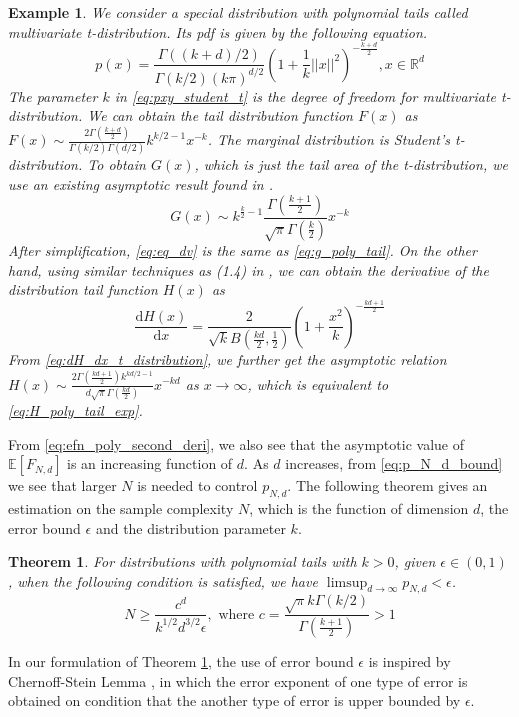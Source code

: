 \documentclass[conference,a4paper]{IEEEtran}
\def\E{\mathbb{E}}
\def\dd{\mathrm{d}}
\newtheorem{theorem}{Theorem}
\newtheorem{example}{Example}
\begin{document}
\begin{example}
     We consider a special distribution with polynomial tails called multivariate t-distribution.
     Its pdf is given by the following equation.
     \begin{equation}\label{eq:pxy_student_t}
          p(x) = \frac{\Gamma((k+d)/2)}{\Gamma(k/2)(k\pi)^{d/2}}
          \left(1+\frac{1}{k}||x||^2
          \right)^{-\frac{k+d}{2}}, x \in \mathbb{R}^d
      \end{equation}
      The parameter $k$ in \eqref{eq:pxy_student_t} is the degree of freedom for multivariate t-distribution.
      We can obtain the tail distribution function
      $F(x)$ as $F(x) \sim \frac{2\Gamma(\frac{k+d}{2})}{\Gamma(k/2)\Gamma(d/2)} k^{k/2-1} x^{-k}$.
      The marginal distribution is Student's t-distribution. To obtain $G(x)$, which is just the tail area
of the t-distribution, we use an existing asymptotic result found in \cite{andrew1976}.
\begin{equation} \label{eq:eq_dv}
    G(x) \sim k^{\frac{k}{2}-1} \frac{\Gamma \left(\frac{k+1}{2} \right)}
    {\sqrt{\pi} \Gamma\left(\frac{k}{2}\right)}x^{-k}
\end{equation}
After simplification, \eqref{eq:eq_dv} is the same as \eqref{eq:g_poly_tail}.
On the other hand, using similar techniques as (1.4) in \cite{raynaud1970enveloppe},
we can obtain the derivative of the distribution tail function $H(x)$ as
\begin{equation}\label{eq:dH_dx_t_distribution}
     \frac{\dd H(x)}{\dd x} =  \frac{2}{\sqrt{k} B(\frac{kd}{2},\frac{1}{2})} \left(1 + \frac{x^2}{k} \right)^{-\frac{kd+1}{2}} 
\end{equation}
From \eqref{eq:dH_dx_t_distribution}, we further get the asymptotic relation $H(x) \sim \frac{2 \Gamma(\frac{kd+1}{2}) k^{kd/2-1}}{d\sqrt{\pi} \Gamma(\frac{kd}{2})}
x^{-kd}$ as $x\to \infty$, which is equivalent to \eqref{eq:H_poly_tail_exp}.

\end{example}
From \eqref{eq:efn_poly_second_deri}, we also see that
the asymptotic value of $\E[F_{N,d}]$ is an increasing function of $d$.
As $d$ increases, from \eqref{eq:p_N_d_bound} we see that larger $N$ is needed to control $p_{N,d}$.
The following theorem gives an estimation on the sample complexity $N$,
which is the function of dimension $d$, the error bound $\epsilon$ and the distribution parameter $k$.
\begin{theorem}\label{thm:poly_tail_sample_complexity}
  For distributions with polynomial tails with $k>0$, given $\epsilon \in (0,1)$,
  when the following condition is satisfied,
  we have $\limsup_{d\to\infty} p_{N,d} < \epsilon$.
\begin{equation}\label{eq:N_c_d_3_2}
  N  \geq \frac{c^d}{k^{1/2}d^{3/2} \epsilon}, \textrm{ where } c=\frac{\sqrt{\pi}k\Gamma(k/2)}{\Gamma(\frac{k+1}{2})}>1  
\end{equation}
\end{theorem}
In our formulation of Theorem \ref{thm:poly_tail_sample_complexity},
the use of error bound $\epsilon$ is inspired by Chernoff-Stein Lemma \cite{cover1999elements},
in which the error exponent of one type of error is obtained on condition that the another type of error is upper bounded by $\epsilon$.
\end{document}
